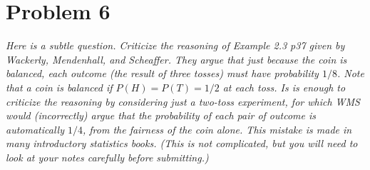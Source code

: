 \documentclass{article}
\begin{document}
\section*{Problem 6}
	\emph{Here is a subtle question. Criticize the reasoning of Example 2.3 p37 given by Wackerly, Mendenhall, and Scheaffer. They argue that just because the coin is balanced, each outcome (the result of three tosses) must have probability $1/8$. Note that a coin is balanced if $P(H) = P(T) = 1/2$ at each toss. Is is enough to criticize the reasoning by considering just a two-toss experiment, for which WMS would (incorrectly) argue that the probability of each pair of outcome is automatically $1/4$, from the fairness of the coin alone. This mistake is made in many introductory statistics books. (This is not complicated, but you will need to look at your notes carefully before submitting.)
	}
\end{document}
